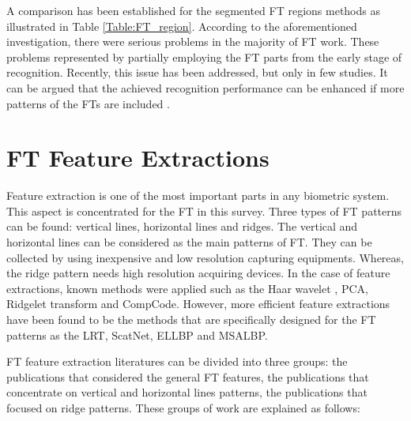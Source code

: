 \documentclass[review]{elsarticle}
\begin{document}
	A comparison has been established for the segmented FT regions methods as illustrated in Table \ref{Table:FT_region}. According to the aforementioned investigation, there were serious problems in the majority of FT work. These problems represented by partially employing the FT parts from the early stage of recognition. Recently, this issue has been addressed, but only in few studies. It can be argued that the achieved recognition performance can be enhanced if more patterns of the FTs are included \cite{Al-Nima2015Human,Al-Nima2017Robust,Al-Nima2017efficient,Al-Nima2017finger}.

\section{FT Feature Extractions}
\label{sub:feature_extraction}
	Feature extraction is one of the most important parts in any biometric system. This aspect is concentrated for the FT in this survey. Three types of FT patterns can be found: vertical lines, horizontal lines and ridges. The vertical and horizontal lines can be considered as the main patterns of FT. They can be collected by using inexpensive and low resolution capturing equipments. Whereas, the ridge pattern needs high resolution acquiring devices. In the case of feature extractions, known methods were applied such as the Haar wavelet \cite{Haar_Wavelet}, PCA, Ridgelet transform \cite{Ridgelet_Transform} and CompCode. However, more efficient feature extractions have been found to be the methods that are specifically designed for the FT patterns as the LRT, ScatNet, ELLBP and MSALBP. 

	FT feature extraction literatures can be divided into three groups: the publications that considered the general FT features, the publications that concentrate on vertical and horizontal lines patterns, the publications that focused on ridge patterns. These groups of work are explained as follows:
\end{document}
